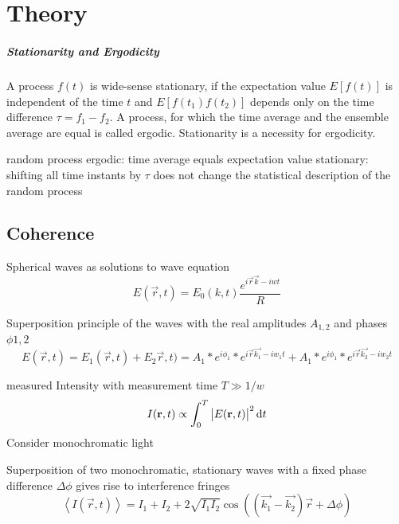 \chapter{Theory}

\cite{goodman2000,goodman2007,agarwal2013,classen2017,cowley1995,born1980,trigg2005,attwood1999,griffiths2005,agarwal2013,classen2017,loudon2000,mandel1995,hanburry1956,galuber2006,baym1997,zernike1938,rosen96,yabashi2002,singer2013,santra2009,krause1979,trost2020,inoue2019,sorum1987,lajunen04,mpccd,tono2013}




\paragraph{Stationarity and Ergodicity}
A process $f(t)$ is wide-sense stationary, if the expectation value $E[f(t)]$ is independent of the time $t$ and $E[f(t_1)f(t_2)]$ depends only on the time difference $\tau=f_1-f_2$. A process, for which the time average and the ensemble average are equal is called ergodic. Stationarity is a necessity for ergodicity.

random process
ergodic: time average equals expectation value
stationary: shifting all time instants by $\tau$ does not change the statistical description of the random process 

\section{Coherence}
Spherical waves as  solutions to wave equation
\begin{equation}
	E(\vec{r},t)=E_0(k,t) \frac{e^{i\vec{r}\vec{k}-iwt}}{R}
	\end{equation}

Superposition principle of the waves with the real amplitudes $A_{1,2}$ and phases $\phi{1,2}$
\begin{equation}
E(\vec{r},t)=E_1(\vec{r},t)+E_2\vec{r},t)=A_1*e^{i\phi_1} * e^{i\vec{r}\vec{k_1}-iw_1t} + A_1*e^{i\phi_1} * e^{i\vec{r}\vec{k_2}-iw_2t} 
\end{equation} 





measured Intensity with measurement time $T\gg1/w$
\begin{equation}
	I(\mathbf{r},t)\propto \int_0^T \left|E(\mathbf{r},t)\right|^2 \operatorname{\mathrm{d}\!} t
\end{equation}
Consider monochromatic light

Superposition of two monochromatic, stationary waves with a fixed phase difference $\Delta \phi$ gives rise to interference fringes
\begin{equation}
	\left<I(\vec{r},t)\right>=I_1+I_2+2\sqrt{I_1I_2}\cos\left((\vec{k_1}-\vec{k_2})\vec{r}+\Delta \phi\right)
\end{equation}

